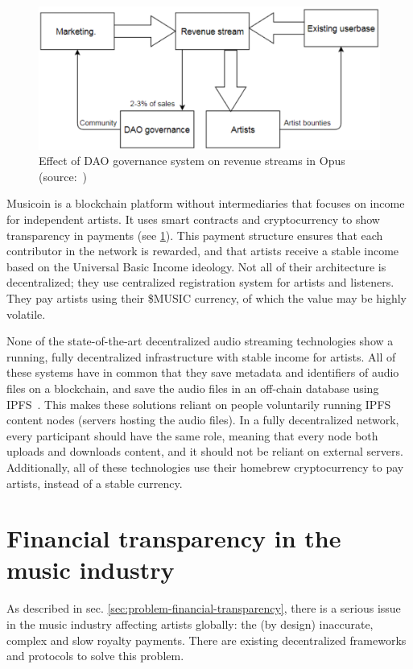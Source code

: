 \begin{figure}
        \includegraphics[width=1\linewidth]{related-work/opus-dao.png}
        \caption{Effect of DAO governance system on revenue streams in Opus (source:~\citep{jia2016opus})}
        \label{fig:opus-dao}
    \endminipage
\end{figure}

Musicoin is a blockchain platform without intermediaries that focuses on income for independent artists. It uses smart contracts and cryptocurrency to show transparency in payments (see \ref{sec:smart-contracts}). This payment structure ensures that each contributor in the network is rewarded, and that artists receive a stable income based on the Universal Basic Income ideology. Not all of their architecture is decentralized; they use centralized registration system for artists and listeners. They pay artists using their \$MUSIC currency, of which the value may be highly volatile.

None of the state-of-the-art decentralized audio streaming technologies show a running, fully decentralized infrastructure with stable income for artists. All of these systems have in common that they save metadata and identifiers of audio files on a blockchain, and save the audio files in an off-chain database using IPFS~\citep{benet2014ipfs}. This makes these solutions reliant on people voluntarily running IPFS content nodes (servers hosting the audio files). In a fully decentralized network, every participant should have the same role, meaning that every node both uploads and downloads content, and it should not be reliant on external servers. Additionally, all of these technologies use their homebrew cryptocurrency to pay artists, instead of a stable currency.

\section{Financial transparency in the music industry}
\label{sec:smart-contracts}
As described in sec. \ref{sec:problem-financial-transparency}, there is a serious issue in the music industry affecting artists globally: the (by design) inaccurate, complex and slow royalty payments. There are existing decentralized frameworks and protocols to solve this problem.

